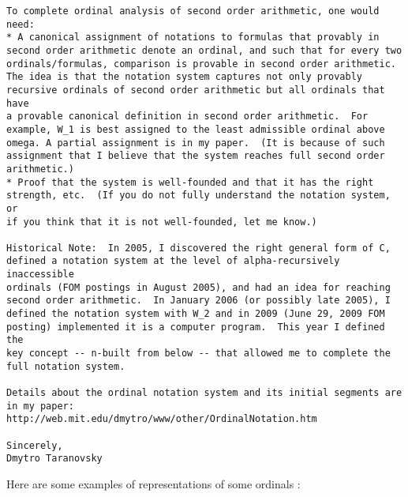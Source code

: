 \documentclass[10pt]{article}
\begin{document}
\begin{verbatim}
To complete ordinal analysis of second order arithmetic, one would need:
* A canonical assignment of notations to formulas that provably in 
second order arithmetic denote an ordinal, and such that for every two 
ordinals/formulas, comparison is provable in second order arithmetic.  
The idea is that the notation system captures not only provably 
recursive ordinals of second order arithmetic but all ordinals that have 
a provable canonical definition in second order arithmetic.  For 
example, W_1 is best assigned to the least admissible ordinal above 
omega. A partial assignment is in my paper.  (It is because of such 
assignment that I believe that the system reaches full second order 
arithmetic.)
* Proof that the system is well-founded and that it has the right 
strength, etc.  (If you do not fully understand the notation system, or 
if you think that it is not well-founded, let me know.)

Historical Note:  In 2005, I discovered the right general form of C, 
defined a notation system at the level of alpha-recursively inaccessible 
ordinals (FOM postings in August 2005), and had an idea for reaching 
second order arithmetic.  In January 2006 (or possibly late 2005), I 
defined the notation system with W_2 and in 2009 (June 29, 2009 FOM 
posting) implemented it is a computer program.  This year I defined the 
key concept -- n-built from below -- that allowed me to complete the 
full notation system.

Details about the ordinal notation system and its initial segments are 
in my paper:
http://web.mit.edu/dmytro/www/other/OrdinalNotation.htm

Sincerely,
Dmytro Taranovsky

\end{verbatim}

Here are some examples of representations of some ordinals : 
\end{document}
